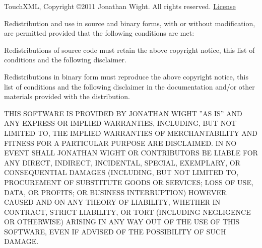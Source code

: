 \documentclass[oneside, openany, 12pt]{tufte-book}
\newcommand{\ipad}[1]{}
\newcommand{\ipad}[1]{#1}
\newcommand{\licensetext}{\scriptsize \setlength{\parskip}{0mm} \singlespacing}
\begin{document}
TouchXML, Copyright \copyright 2011 Jonathan Wight. All rights reserved. \href{https://github.com/TouchCode/TouchXML/blob/master/README.markdown}{License} 

{\licensetext
Redistribution and use in source and binary forms, with or without modification, are permitted provided that the following conditions are met:

Redistributions of source code must retain the above copyright notice, this list of conditions and the following disclaimer.

Redistributions in binary form must reproduce the above copyright notice, this list of conditions and the following disclaimer in the documentation and/or other materials provided with the distribution.

THIS SOFTWARE IS PROVIDED BY JONATHAN WIGHT ''AS IS'' AND ANY EXPRESS OR IMPLIED WARRANTIES, INCLUDING, BUT NOT LIMITED TO, THE IMPLIED WARRANTIES OF MERCHANTABILITY AND FITNESS FOR A PARTICULAR PURPOSE ARE DISCLAIMED. IN NO EVENT SHALL JONATHAN WIGHT OR CONTRIBUTORS BE LIABLE FOR ANY DIRECT, INDIRECT, INCIDENTAL, SPECIAL, EXEMPLARY, OR CONSEQUENTIAL DAMAGES (INCLUDING, BUT NOT LIMITED TO, PROCUREMENT OF SUBSTITUTE GOODS OR SERVICES; LOSS OF USE, DATA, OR PROFITS; OR BUSINESS INTERRUPTION) HOWEVER CAUSED AND ON ANY THEORY OF LIABILITY, WHETHER IN CONTRACT, STRICT LIABILITY, OR TORT (INCLUDING NEGLIGENCE OR OTHERWISE) ARISING IN ANY WAY OUT OF THE USE OF THIS SOFTWARE, EVEN IF ADVISED OF THE POSSIBILITY OF SUCH DAMAGE.}

\ipad{\end{fullwidth}}
\end{document}
